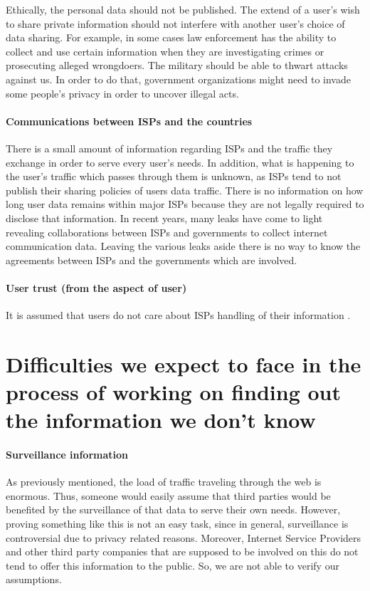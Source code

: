 Ethically, the personal data should not be published. The extend of a user's 
wish to share private information should not interfere with another user's 
choice of data sharing. For example, in some cases law enforcement has the 
ability to collect and use certain information when they are investigating 
crimes or prosecuting alleged wrongdoers. The military  should  be able to 
thwart attacks against us. In order to do that, government organizations might 
need to invade some people's privacy in order to uncover illegal acts. 

\paragraph{Communications between ISPs and the countries}

There is a small amount of information regarding ISPs and the traffic they 
exchange in order to serve every user's needs. In addition, what is happening to
the user's traffic which passes through them is unknown, as ISPs tend to not 
publish their sharing policies of users data traffic. There is no information on 
how long user data remains within major ISPs because they are not legally 
required to disclose that information. In recent years, many leaks have come to 
light revealing collaborations between ISPs and governments to collect internet 
communication data. Leaving the various leaks aside there is no way to know the 
agreements between ISPs and the governments which are involved. 

\paragraph{User trust (from the aspect of user)}
It is assumed that users do not care about ISPs handling of their information 
\cite{isp1, isp2}.

\section{Difficulties we expect to face in the process of working on finding 
out the information we don't know} 

\paragraph{Surveillance information}
As previously mentioned, the load of traffic traveling through the web is 
enormous. Thus, someone would easily assume that third parties would be 
benefited by the surveillance of that data to serve their own needs. However, 
proving something like this is not an easy task, since in general, surveillance 
is controversial due to privacy related reasons. Moreover, Internet Service 
Providers and other third party companies that are supposed to be involved on 
this do not tend to offer this information to the public. So, we are not able to 
verify our assumptions.  

